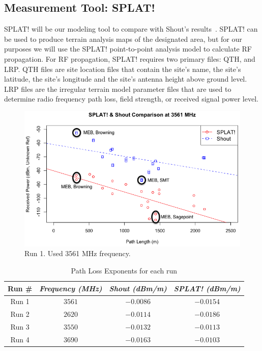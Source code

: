 \subsection{Measurement Tool: SPLAT!}
SPLAT! will be our modeling tool to compare with Shout's results~\cite{b3}. SPLAT! can be used to produce terrain analysis 
maps of the designated area, but for our purposes we will use the SPLAT! point-to-point analysis model to calculate RF 
propagation. For RF propagation, SPLAT! requires two primary files: QTH, and LRP. QTH files are site location files that contain
the site's name, the site's latitude, the site's longitude and the site's antenna height above ground level. LRP files are the irregular
terrain model parameter files that are used to determine radio frequency path loss, field strength, or received signal power level. 

\begin{figure}[htbp]
\centerline{\includegraphics[width=0.9\columnwidth]{figs/3561.png}}
\vspace{-3mm}
\caption{Run 1. Used 3561 MHz frequency.}
\label{3561}
\vspace{-3mm}
\end{figure}

\begin{table}[htbp]
\caption{Path Loss Exponents for each run}
\begin{center}
\begin{tabular}{|c|c|c|c|}
\hline
\textbf{Run \#} & \textbf{\textit{Frequency (MHz)}}& \textbf{\textit{Shout (dBm/m)}}& \textbf{\textit{SPLAT! (dBm/m)}} \\
\hline
Run 1& $3561$& $-0.0086$& $-0.0154$  \\
Run 2& $2620$& $-0.0114$& $-0.0186$  \\
Run 3& $3550$& $-0.0132$& $-0.0113$  \\
Run 4& $3690$& $-0.0163$& $-0.0103$  \\
\hline
\end{tabular}
\label{tab1}
\vspace{-3mm}
\end{center}
\end{table}

